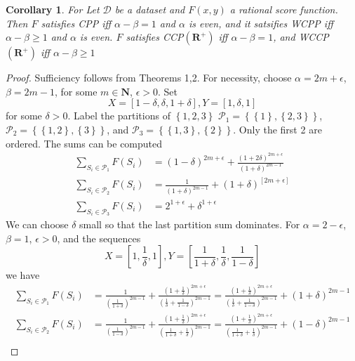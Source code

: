 \documentclass{article}
\newtheorem{corollary}{Corollary}
\theoremstyle{case}
\begin{document}
\begin{corollary}
For Let $\mathcal{D}$ be a dataset and $F(x,y)$ a rational score function. Then $F$ satisfies CPP iff $\alpha - \beta = 1$ and $\alpha$ is even, and it satsifies WCPP iff $\alpha - \beta \geq 1$ and $\alpha$ is even. $F$ satisfies CCP$(\mathbf{R}^+)$ iff $\alpha - \beta = 1$, and WCCP$(\mathbf{R}^+)$ iff $\alpha - \beta \geq 1$
\end{corollary}
\begin{proof}
Sufficiency follows from Theorems 1,2. For necessity, choose $\alpha = 2m + \epsilon$, $\beta = 2m -1$, for some $m \in \mathbf{N}$, $\epsilon > 0$. Set
\[
X = \left[ 1-\delta, \delta, 1 + \delta\right], Y = \left[ 1, \delta, 1\right]
\] 
for some $\delta > 0$. Label the partitions of $\left\lbrace 1, 2, 3\right\rbrace$ $\mathcal{P}_1 = \left\lbrace \left\lbrace 1 \right\rbrace, \left\lbrace 2, 3\right\rbrace \right\rbrace$, $\mathcal{P}_2 = \left\lbrace \left\lbrace 1, 2 \right\rbrace, \left\lbrace 3\right\rbrace \right\rbrace$, and $\mathcal{P}_3 = \left\lbrace \left\lbrace 1, 3 \right\rbrace, \left\lbrace 2 \right\rbrace \right\rbrace$. Only the first 2 are ordered. The sums can be computed
\begin{align*}
\sum_{S_i \in \mathcal{P}_1}F(S_i) & = \left( 1-\delta \right)^{2m+\epsilon} + \frac{\left( 1+2\delta\right)^{2m+\epsilon}}{(1+\delta)^{2m-1}} \\
\sum_{S_i \in \mathcal{P}_2}F(S_i)  & = \frac{1}{(1+\delta)^{2m-1}} + \left( 1+\delta\right)^[2m+\epsilon] \\
\sum_{S_i \in \mathcal{P}_3}F(S_i)  & = 2^{1+\epsilon} + \delta^{1+\epsilon}
\end{align*}
We can choose $\delta$ small so that the last partition sum dominates.
For $\alpha = 2 - \epsilon$, $\beta = 1$, $\epsilon > 0$, and the sequences
\[
X = \left[ 1, \frac{1}{\delta}, 1\right], Y = \left[ \frac{1}{1+\delta}, \frac{1}{\delta}, \frac{1}{1-\delta}\right]
\] 
we have
\begin{align*}
\sum_{S_i \in \mathcal{P}_1}F(S_i) & = \frac{1}{(\frac{1}{1+\delta})^{2m-1}} + \frac{\left(1 + \frac{1}{\delta}\right)^{2m+\epsilon}}{\left( \frac{1}{\delta} + \frac{1}{1 - \delta}\right)^{2m-1} }  = \frac{\left(1 + \frac{1}{\delta}\right)^{2m+\epsilon}}{\left( \frac{1}{\delta} + \frac{1}{1 - \delta}\right)^{2m-1} } + \left( 1 + \delta \right)^{2m-1}\\
\sum_{S_i \in \mathcal{P}_2}F(S_i) & = \frac{1}{(\frac{1}{1-\delta})^{2m-1}} + \frac{\left( 1 + \frac{1}{\delta}\right)^{2m+\epsilon}}{\left( \frac{1}{1+\delta} + \frac{1}{\delta}\right)^{2m-1}}  = \frac{\left( 1 + \frac{1}{\delta}\right)^{2m+\epsilon}}{\left( \frac{1}{1+\delta} + \frac{1}{\delta}\right)^{2m-1}} + \left( 1 - \delta \right)^{2m-1}\\

\end{align*}
\end{proof}
\end{document}
